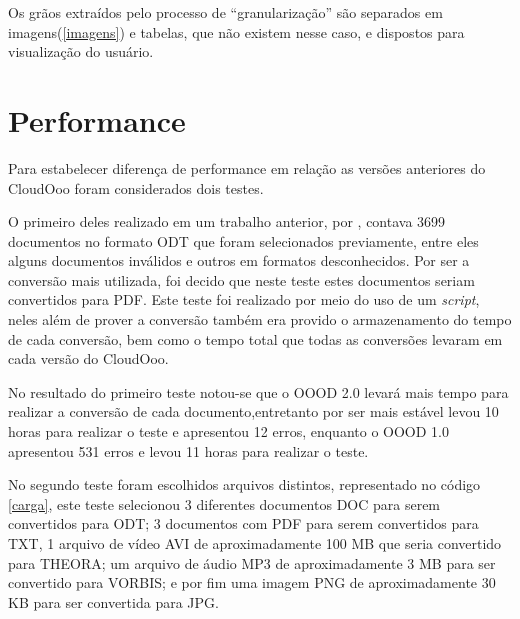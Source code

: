 \newpage
Os grãos extraídos pelo processo de ``granularização'' são separados em imagens(\ref{imagens}) e tabelas, que não existem nesse caso, e dispostos para visualização do usuário.


\newpage
\section{Performance}

Para estabelecer diferença de performance em relação as versões anteriores do CloudOoo foram considerados dois testes.

O primeiro deles realizado em um trabalho anterior, por , contava 3699 documentos no formato ODT que foram selecionados previamente, entre eles alguns documentos inválidos e outros em formatos desconhecidos. Por ser a conversão mais utilizada, foi decido que neste teste estes documentos seriam convertidos para PDF. 
Este teste foi realizado por meio do uso de um \textit{script}, neles além de prover a conversão também era provido o armazenamento do tempo de cada conversão, bem como o tempo total que todas as conversões levaram em cada versão do CloudOoo.

No resultado do primeiro teste notou-se que o OOOD 2.0 levará mais tempo para realizar a conversão de cada documento,entretanto por ser mais estável levou 10 horas para realizar o teste e apresentou 12 erros, enquanto o OOOD 1.0 apresentou 531 erros e levou 11 horas para realizar o teste.

No segundo teste foram escolhidos arquivos distintos, representado no código \ref{carga}, este teste selecionou 3 diferentes documentos DOC para serem convertidos para ODT; 3 documentos com PDF para serem convertidos para TXT, 1 arquivo de vídeo AVI de aproximadamente 100 MB que seria convertido para THEORA; um arquivo de áudio MP3 de aproximadamente 3 MB para ser convertido para VORBIS; e por fim uma imagem PNG de aproximadamente 30 KB para ser convertida para JPG.

